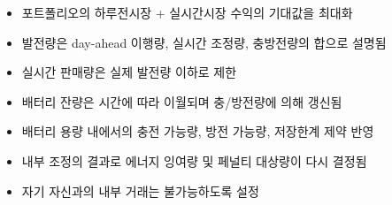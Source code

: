 \documentclass[xcolor=dvipsnames,t,9pt]{beamer}
\begin{document}
{\begin{frame}[noframenumbering]
    \small
    \begin{itemize}
        \item[(1a)] 포트폴리오의 하루전시장 + 실시간시장 수익의 기대값을 최대화
        \item[(1b)] 발전량은 day-ahead 이행량, 실시간 조정량, 충방전량의 합으로 설명됨
        \item[(1c)] 실시간 판매량은 실제 발전량 이하로 제한
        \item[(1d)] 배터리 잔량은 시간에 따라 이월되며 충/방전량에 의해 갱신됨
        \item[(1e)] 배터리 용량 내에서의 충전 가능량, 방전 가능량, 저장한계 제약 반영
        \item[(1f)] 내부 조정의 결과로 에너지 잉여량 및 페널티 대상량이 다시 결정됨
        \item[(1g)] 자기 자신과의 내부 거래는 불가능하도록 설정
    \end{itemize}
\end{frame}
}

\end{document}

